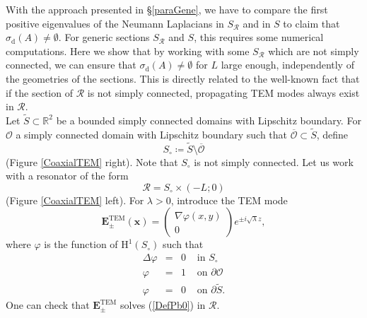 \documentclass[11pt,a4paper]{article}
\newcommand{\mrm}[1]{\mathrm{#1}}
\newcommand{\bfx}{\boldsymbol{x}}
\newcommand{\R}{\mathbb{R}}
\newcommand{\mH}{\mrm{H}}
\def\E{\boldsymbol{E}}
\begin{document}
\noindent With the approach presented in \S\ref{paraGene}, we have to compare the first positive eigenvalues of the Neumann Laplacians in $S_\mathcal{R}$ and in $S$ to claim that $\sigma_{\mrm{d}}(A)\ne\emptyset$. For generic sections $S_\mathcal{R}$ and $S$, this requires some numerical computations. Here we show that by working with some $S_\mathcal{R}$ which are not simply connected, we can ensure that $\sigma_{\mrm{d}}(A)\ne\emptyset$ for $L$ large enough, independently of the geometries of the sections. This is directly related to the well-known fact that if the section of $\mathcal{R}$ is not simply connected, propagating TEM modes always exist in $\mathcal{R}$. \\
\newline 
Let $\tilde{S}\subset \R^2$ be a bounded simply connected domains with Lipschitz boundary. For $\mathcal{O}$ a simply connected domain with Lipschitz boundary such that $\overline{\mathcal{O}}\subset \tilde{S}$, define 
\[
S_\circ\coloneqq\tilde{S}\setminus\overline{\mathcal{O}}
\]
(Figure \ref{CoaxialTEM} right). Note that $S_\circ$ is not simply connected. Let us work with a resonator of the form 
\begin{equation}\label{DefSectionsNotSC}
\mathcal{R}=S_\circ\times(-L;0)
\end{equation}
(Figure \ref{CoaxialTEM} left). For $\lambda>0$, introduce the TEM mode
\[
\E^{\mrm{TEM}}_\pm(\bfx)=\left( \begin{array}{c}
\nabla \varphi(x,y) \\[2pt]
0
\end{array}
\right)e^{\pm i\sqrt{\lambda}z},
\]
where $\varphi$ is the function of $\mH^1(S_\circ)$ such that 
\begin{equation}\label{DefPhi}
\begin{array}{|rccl}
\Delta\varphi&=&0 & \mbox{ in }S_\circ\\[2pt]
\varphi&=&1 & \mbox{ on }\partial\mathcal{O}\\[2pt]
\varphi&=&0 & \mbox{ on }\partial \tilde{S}.
\end{array}
\end{equation}
One can check that $\E^{\mrm{TEM}}_\pm$ solves (\ref{DefPb0}) in $\mathcal{R}$.
\end{document}
